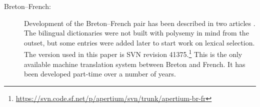 \documentclass[11pt]{article}
\begin{document}



\begin{description}
\item[Breton--French:] Development of the Breton--French pair has been
  described in two articles \citep{tyers09b,tyers10b}. The bilingual
  dictionaries were not built with polysemy in mind from the outset,
  but some entries were added later to start work on lexical
  selection. The version used in this paper is SVN revision
  41375.\footnote{\url{https://svn.code.sf.net/p/apertium/svn/trunk/apertium-br-fr}}
  This is the only available machine translation system between Breton
  and French. It has been developed part-time over a number of years.



\end{description}
\end{document}
